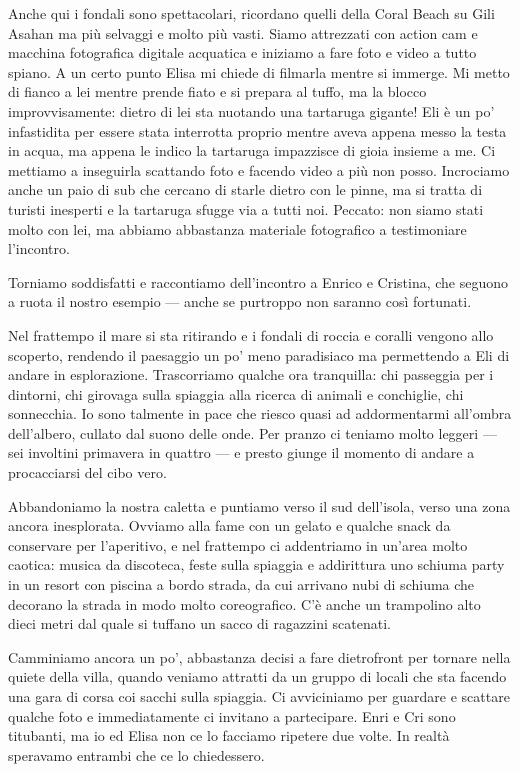 Anche qui i fondali sono spettacolari, ricordano quelli della Coral Beach su Gili Asahan ma più selvaggi e molto più vasti. Siamo attrezzati con action cam e macchina fotografica digitale acquatica e iniziamo a fare foto e video a tutto spiano. A un certo punto Elisa mi chiede di filmarla mentre si immerge. Mi metto di fianco a lei mentre prende fiato e si prepara al tuffo, ma la blocco improvvisamente: dietro di lei sta nuotando una tartaruga gigante! Eli è un po' infastidita per essere stata interrotta proprio mentre aveva appena messo la testa in acqua, ma appena le indico la tartaruga impazzisce di gioia insieme a me. Ci mettiamo a inseguirla scattando foto e facendo video a più non posso. Incrociamo anche un paio di sub che cercano di starle dietro con le pinne, ma si tratta di turisti inesperti e la tartaruga sfugge via a tutti noi. Peccato: non siamo stati molto con lei, ma abbiamo abbastanza materiale fotografico a testimoniare l'incontro.

Torniamo soddisfatti e raccontiamo dell'incontro a Enrico e Cristina, che seguono a ruota il nostro esempio — anche se purtroppo non saranno così fortunati.

Nel frattempo il mare si sta ritirando e i fondali di roccia e coralli vengono allo scoperto, rendendo il paesaggio un po' meno paradisiaco ma permettendo a Eli di andare in esplorazione. Trascorriamo qualche ora tranquilla: chi passeggia per i dintorni, chi girovaga sulla spiaggia alla ricerca di animali e conchiglie, chi sonnecchia. Io sono talmente in pace che riesco quasi ad addormentarmi all'ombra dell'albero, cullato dal suono delle onde. Per pranzo ci teniamo molto leggeri — sei involtini primavera in quattro — e presto giunge il momento di andare a procacciarsi del cibo vero.

Abbandoniamo la nostra caletta e puntiamo verso il sud dell'isola, verso una zona ancora inesplorata. Ovviamo alla fame con un gelato e qualche snack da conservare per l'aperitivo, e nel frattempo ci addentriamo in un'area molto caotica: musica da discoteca, feste sulla spiaggia e addirittura uno schiuma party in un resort con piscina a bordo strada, da cui arrivano nubi di schiuma che decorano la strada in modo molto coreografico. C'è anche un trampolino alto dieci metri dal quale si tuffano un sacco di ragazzini scatenati.

Camminiamo ancora un po', abbastanza decisi a fare dietrofront per tornare nella quiete della villa, quando veniamo attratti da un gruppo di locali che sta facendo una gara di corsa coi sacchi sulla spiaggia. Ci avviciniamo per guardare e scattare qualche foto e immediatamente ci invitano a partecipare. Enri e Cri sono titubanti, ma io ed Elisa non ce lo facciamo ripetere due volte. In realtà speravamo entrambi che ce lo chiedessero.

